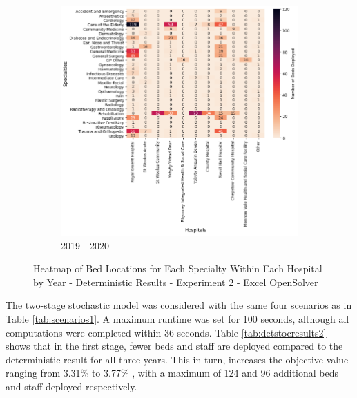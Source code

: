 \documentclass[../thesis.tex]{subfiles}
\begin{document}
\hfill
\begin{figure}\ContinuedFloat
     \begin{subfigure}{0.8\textwidth}
         \centering
         \includegraphics[width=\textwidth]{Chapters/Chapter5/Figures/2019DET.png}
         \caption{2019 - 2020}
         \label{fig:detexp2c}
     \end{subfigure}
        \caption{Heatmap of Bed Locations for Each Specialty Within Each Hospital by Year - Deterministic Results - Experiment 2 - Excel OpenSolver}
        \label{fig:detexp2}
\end{figure}

    





The two-stage stochastic model was considered with the same four scenarios as in Table \ref{tab:scenarios1}. A maximum runtime was set for 100 seconds, although all computations were completed within 36 seconds. Table \ref{tab:detstocresults2} shows that in the first stage, fewer beds and staff are deployed compared to the deterministic result for all three years. This in turn, increases the objective value ranging from 3.31\% to 3.77\% , with a maximum of 124 and 96 additional beds and staff deployed respectively. 
\end{document}
